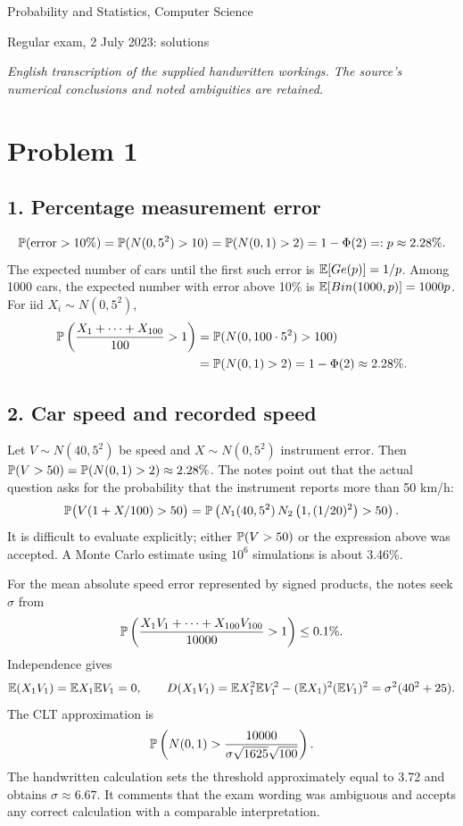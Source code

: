 \documentclass[a4paper]{article}
\begin{document}
\begin{center}\Large Probability and Statistics, Computer Science\par\large Regular exam, 2 July 2023: solutions\end{center}
\noindent\textit{English transcription of the supplied handwritten workings. The source's numerical conclusions and noted ambiguities are retained.}
\section*{Problem 1}
\subsection*{1. Percentage measurement error}
\[\P(\text{error}>10\%)=\P(N(0,5^2)>10)=\P(N(0,1)>2)=1-\Phi(2)=:p\approx2.28\%.\]
The expected number of cars until the first such error is $\E[Ge(p)]=1/p$. Among 1000 cars, the expected number with error above 10\% is $\E[Bin(1000,p)]=1000p$.
For iid $X_i\sim N(0,5^2)$,
\begin{align*}
\P\left(\frac{X_1+\cdots+X_{100}}{100}>1\right)
&=\P(N(0,100\cdot5^2)>100)\\
&=\P(N(0,1)>2)=1-\Phi(2)\approx2.28\%.
\end{align*}
\subsection*{2. Car speed and recorded speed}
Let $V\sim N(40,5^2)$ be speed and $X\sim N(0,5^2)$ instrument error. Then $\P(V>50)=\P(N(0,1)>2)\approx2.28\%$.
The notes point out that the actual question asks for the probability that the instrument reports more than 50 km/h:
\[\P\bigl(V(1+X/100)>50\bigr)=\P\left(N_1(40,5^2)\,N_2\left(1,(1/20)^2\right)>50\right).\]
It is difficult to evaluate explicitly; either $\P(V>50)$ or the expression above was accepted. A Monte Carlo estimate using $10^6$ simulations is about 3.46\%.

For the mean absolute speed error represented by signed products, the notes seek $\sigma$ from
\[\P\left(\frac{X_1V_1+\cdots+X_{100}V_{100}}{10000}>1\right)\le0.1\%.\]
Independence gives
\[\E(X_1V_1)=\E X_1\E V_1=0,\qquad
D(X_1V_1)=\E X_1^2\E V_1^2-(\E X_1)^2(\E V_1)^2=\sigma^2(40^2+25).\]
The CLT approximation is
\[\P\left(N(0,1)>\frac{10000}{\sigma\sqrt{1625}\sqrt{100}}\right).\]
The handwritten calculation sets the threshold approximately equal to 3.72 and obtains $\sigma\approx6.67$. It comments that the exam wording was ambiguous and accepts any correct calculation with a comparable interpretation.
\end{document}
